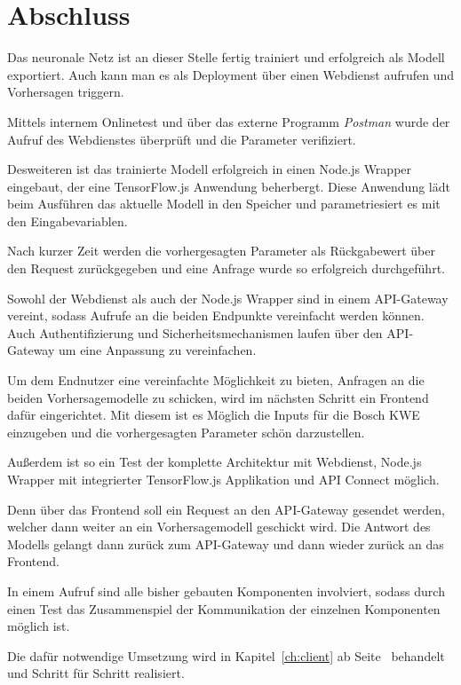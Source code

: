 \section{Abschluss}
Das neuronale Netz ist an dieser Stelle fertig trainiert und erfolgreich als Modell exportiert. Auch kann man es als
Deployment über einen Webdienst aufrufen und Vorhersagen triggern.

Mittels internem Onlinetest und über das externe Programm \textit{Postman} wurde der Aufruf des Webdienstes überprüft
und die Parameter verifiziert.

Desweiteren ist das trainierte Modell erfolgreich in einen Node.js Wrapper eingebaut, der eine TensorFlow.js
Anwendung beherbergt. Diese Anwendung lädt beim Ausführen das aktuelle Modell in den Speicher und parametriesiert es
mit den Eingabevariablen.

Nach kurzer Zeit werden die vorhergesagten Parameter als Rückgabewert über den Request zurückgegeben und eine Anfrage
wurde so erfolgreich durchgeführt.

Sowohl der Webdienst als auch der Node.js Wrapper sind in einem API-Gateway vereint, sodass Aufrufe an die beiden
Endpunkte vereinfacht werden können. Auch Authentifizierung und Sicherheitsmechanismen laufen über den API-Gateway um
eine Anpassung zu vereinfachen.

Um dem Endnutzer eine vereinfachte Möglichkeit zu bieten, Anfragen an die beiden Vorhersagemodelle zu schicken, wird
im nächsten Schritt ein Frontend dafür eingerichtet. Mit diesem ist es Möglich die Inputs für die Bosch KWE einzugeben
und die vorhergesagten Parameter schön darzustellen.

Außerdem ist so ein Test der komplette Architektur mit Webdienst, Node.js Wrapper mit integrierter TensorFlow.js
Applikation und API Connect möglich.

Denn über das Frontend soll ein Request an den API-Gateway gesendet werden, welcher dann weiter an ein Vorhersagemodell
geschickt wird. Die Antwort des Modells gelangt dann zurück zum API-Gateway und dann wieder zurück an das Frontend.

In einem Aufruf sind alle bisher gebauten Komponenten involviert, sodass durch einen Test das Zusammenspiel der
Kommunikation der einzelnen Komponenten möglich ist.

Die dafür notwendige Umsetzung wird in Kapitel~\ref{ch:client} ab Seite~\pageref{ch:client} behandelt und Schritt für
Schritt realisiert.